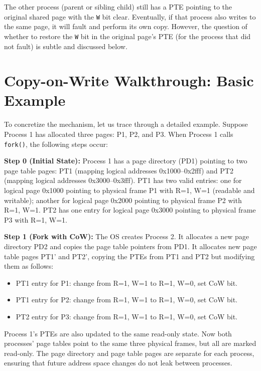 \documentclass[11pt]{article}
\begin{document}
The other process (parent or sibling child) still has a PTE pointing to the original shared page with the \texttt{W} bit clear. Eventually, if that process also writes to the same page, it will fault and perform its own copy. However, the question of whether to restore the \texttt{W} bit in the original page's PTE (for the process that did not fault) is subtle and discussed below.

\section{Copy-on-Write Walkthrough: Basic Example}

To concretize the mechanism, let us trace through a detailed example. Suppose Process 1 has allocated three pages: P1, P2, and P3. When Process 1 calls \texttt{fork()}, the following steps occur:

\textbf{Step 0 (Initial State):} Process 1 has a page directory (PD1) pointing to two page table pages: PT1 (mapping logical addresses 0x1000--0x2fff) and PT2 (mapping logical addresses 0x3000--0x3fff). PT1 has two valid entries: one for logical page 0x1000 pointing to physical frame P1 with R=1, W=1 (readable and writable); another for logical page 0x2000 pointing to physical frame P2 with R=1, W=1. PT2 has one entry for logical page 0x3000 pointing to physical frame P3 with R=1, W=1.

\textbf{Step 1 (Fork with CoW):} The OS creates Process 2. It allocates a new page directory PD2 and copies the page table pointers from PD1. It allocates new page table pages PT1' and PT2', copying the PTEs from PT1 and PT2 but modifying them as follows:
\begin{itemize}
    \item PT1 entry for P1: change from R=1, W=1 to R=1, W=0, set CoW bit.
    \item PT1 entry for P2: change from R=1, W=1 to R=1, W=0, set CoW bit.
    \item PT2 entry for P3: change from R=1, W=1 to R=1, W=0, set CoW bit.
\end{itemize}

Process 1's PTEs are also updated to the same read-only state. Now both processes' page tables point to the same three physical frames, but all are marked read-only. The page directory and page table pages are separate for each process, ensuring that future address space changes do not leak between processes.
\end{document}

